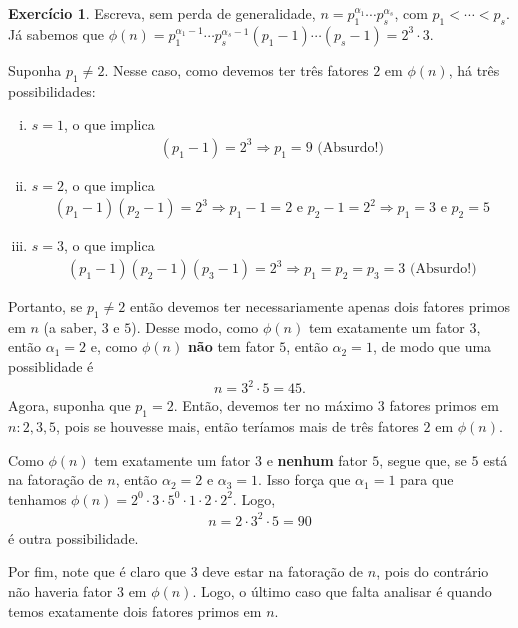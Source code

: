 \documentclass[a4paper,12pt]{article}
\theoremstyle{definition}
\newtheorem{exercise}{Exercício}%
\begin{document}
	\begin{exercise}
		Escreva, sem perda de generalidade, $n = p_1^{\alpha_1}\cdots p_s^{\alpha_s}$, com $p_1 < \cdots < p_s$. Já sabemos que $\phi(n) = p_1^{\alpha_1 - 1}\cdots p_s^{\alpha_s - 1}(p_1 - 1)\cdots (p_s - 1) = 2^3\cdot 3$.
		\par\vspace{0.3cm} Suponha $p_1\neq 2$. Nesse caso, como devemos ter três fatores $2$ em $\phi(n)$, há três possibilidades:
		\begin{enumerate}[(i)]
			\item $s=1$, o que implica
			\begin{align*}
			(p_1 - 1) = 2^3 \Rightarrow p_1 = 9 \text{ (Absurdo!)}
			\end{align*}
			\item $s=2$, o que implica
			\begin{align*}
			(p_1 - 1)(p_2 - 1) = 2^3\Rightarrow p_1 - 1 = 2 \text{ e } p_2 - 1 = 2^2 \Rightarrow p_1 = 3 \text{ e } p_2 = 5
			\end{align*}
			\item $s=3$, o que implica
			\begin{align*}
			(p_1 - 1)(p_2 - 1)(p_3 - 1) = 2^3\Rightarrow p_1 = p_2 = p_3 = 3 \text{ (Absurdo!)}
			\end{align*}
		\end{enumerate}
	Portanto, se $p_1\neq 2$ então devemos ter necessariamente apenas dois fatores primos em $n$ (a saber, $3$ e $5$). Desse modo, como $\phi(n)$ tem exatamente um fator $3$, então $\alpha_1 = 2$ e, como $\phi(n)$ \textbf{não} tem fator $5$, então $\alpha_2 = 1$, de modo que uma possiblidade é 
	\begin{align*}
	n = 3^2\cdot 5 = 45.
	\end{align*}
	Agora, suponha que $p_1 = 2$. Então, devemos ter no máximo $3$ fatores primos em $n: 2, 3, 5$, pois se houvesse mais, então teríamos mais de três fatores $2$ em $\phi(n)$. 
	\par\vspace{0.3cm} Como $\phi(n)$ tem exatamente um fator $3$ e \textbf{nenhum} fator $5$, segue que, se $5$ está na fatoração de $n$, então $\alpha_2 = 2$ e $\alpha_3 = 1$. Isso força que $\alpha_1 = 1$ para que tenhamos $\phi(n) = 2^0\cdot 3\cdot 5^0\cdot 1\cdot 2\cdot 2^2$. Logo, 
	\begin{align*}
	n = 2\cdot 3^2\cdot 5 = 90
	\end{align*} 
	é outra possibilidade.
	\par\vspace{0.3cm} Por fim, note que é claro que $3$ deve estar na fatoração de $n$, pois do contrário não haveria fator $3$ em $\phi(n)$. Logo, o último caso que falta analisar é quando temos exatamente dois fatores primos em $n$.

\end{exercise}
\end{document}
